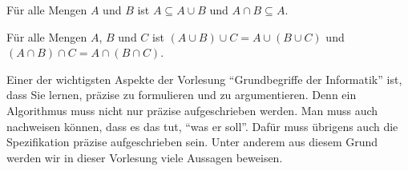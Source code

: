\begin{lemma}
  \label{lem:mengen-meet-join}
  Für alle Mengen $A$ und $B$ ist $A\subseteq A\cup B$ und
  $A\cap B \subseteq A$.
\end{lemma}

\begin{lemma}
  \label{lem:mengen-assoziativitaet}
  \raggedright
  Für alle Mengen $A$, $B$ und $C$ ist
  $(A\cup B) \cup C=A\cup(B\cup C)$ und
  $(A\cap B) \cap C=A\cap(B\cap C)$.
\end{lemma}
%
Einer der wichtigsten Aspekte der Vorlesung "`Grundbegriffe der
Informatik"' ist, dass Sie lernen, präzise zu formulieren und zu
argumentieren.
%
Denn ein Algorithmus muss nicht nur präzise aufgeschrieben werden.
%
Man muss auch nachweisen können, dass es das tut, "`was er soll"'.
%
Dafür muss übrigens auch die Spezifikation präzise aufgeschrieben
sein.
%
Unter anderem aus diesem Grund werden wir in dieser Vorlesung viele
Aussagen beweisen.

